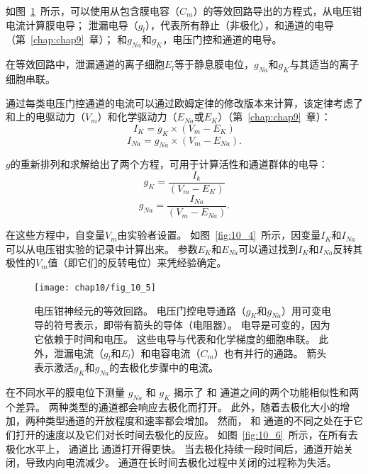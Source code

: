 \begin{proposition}[从电压钳数据计算膜电导] \label{box:10_2}
	
	\quad \quad 如图~\ref{fig:10_5}~所示，可以使用从包含膜电容（$C_m$）的等效回路导出的方程式，从电压钳电流计算膜电导；
	泄漏电导（$g_l$），代表所有静止（非极化），和通道的电导（第~\ref{chap:chap9}~章）；
	和$g_{Na}$和$g_K$，电压门控和通道的电导。
	
	\quad \quad 在等效回路中，泄漏通道的离子细胞$E_l$等于静息膜电位，$g_{Na}$和$g_K$与其适当的离子细胞串联。
	
	\quad \quad 通过每类电压门控通道的电流可以通过欧姆定律的修改版本来计算，该定律考虑了和上的电驱动力（$V_m$）和化学驱动力（$E_{Na}$或$E_K$）（第~\ref{chap:chap9}~章）：
	\begin{equation}
		I_K = g_K \times (V_m - E_K)
	\end{equation}
	\begin{equation}
		I_{Na} = g_{Na} \times (V_m - E_{Na}).
	\end{equation}
	
	\quad \quad $g$的重新排列和求解给出了两个方程，可用于计算活性和通道群体的电导：
	\begin{equation}
		g_K = \frac{I_k}{(V_m - E_K)}
	\end{equation}
	\begin{equation}
		g_{Na} = \frac{I_{Na}}{(V_m - E_{Na})}.
	\end{equation}
	
	\quad \quad 在这些方程中，自变量$V_m$由实验者设置。
	如图~\ref{fig:10_4}~所示，因变量$I_K$和$I_{Na}$可以从电压钳实验的记录中计算出来。
	参数$E_K$和$E_{Na}$可以通过找到$I_K$和$I_{Na}$反转其极性的$V_m$值（即它们的反转电位）来凭经验确定。
	
\end{proposition}


\begin{figure}[htbp]
	\centering
	\texttt{[image: chap10/fig\_10\_5]}
	\caption{电压钳神经元的等效回路。
		电压门控电导通路（$g_K$和$g_{Na}$）用可变电导的符号表示，即带有箭头的导体（电阻器）。
		电导是可变的，因为它依赖于时间和电压。
		这些电导与代表和化学梯度的细胞串联。
		此外，泄漏电流（$g_l$和$E_l$）和电容电流（$C_m$）也有并行的通路。
		箭头表示激活$g_K$和$g_{Na}$的去极化步骤中的电流。}
	\label{fig:10_5}
\end{figure}


在不同水平的膜电位下测量 $g_{Na}$ 和 $g_K$ 揭示了  和  通道之间的两个功能相似性和两个差异。
两种类型的通道都会响应去极化而打开。
此外，随着去极化大小的增加，两种类型通道的开放程度和速率都会增加。
然而， 和  通道的不同之处在于它们打开的速度以及它们对长时间去极化的反应。
如图~\ref{fig:10_6}~所示，在所有去极化水平上， 通道比  通道打开得更快。 
当去极化持续一段时间后，通道开始关闭，导致内向电流减少。
 通道在长时间去极化过程中关闭的过程称为失活。


